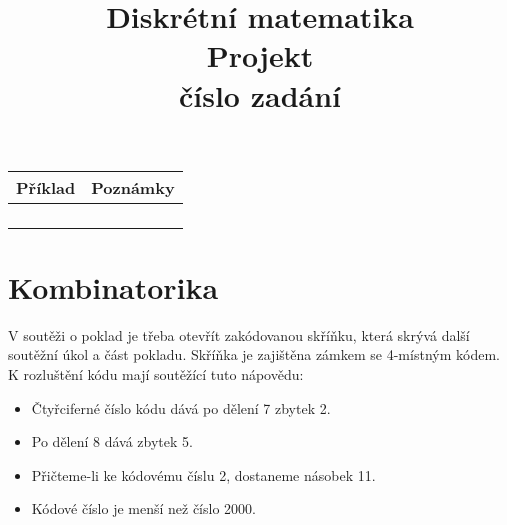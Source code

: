 \documentclass[a4paper, 10pt, oneside]{article}       %
\title{\Huge\textbf{Diskrétní matematika}\\
{\textbf{Projekt}}\\
{\Large číslo zadání \underline{\makebox[1cm]{3}}}}
\author{}                                             %
\date{}
\begin{document}
\shorthandoff{-}

\maketitle\thispagestyle{fancy}

\vfill
\hfill
\begin{table}[b]
  \begin{tabular}{c|p{3cm}}
    \textbf{Příklad} & \textbf{Poznámky} \\
    \hline
        \rule{0pt}{1cm} \centering 1 &  \\
        \rule{0pt}{1.5cm}\\
        \rule{0pt}{1cm} \centering 2 &  \\
        \rule{0pt}{1.5cm}\\
  \end{tabular}
\end{table}

\clearpage                                            %

\fancyhead{}                                          %
\fancyfoot{}                                          %


\fancyhead[RO]{\thepage}                              %

\newpage
\setcounter{page}{1}
\section{Kombinatorika}\label{sec:sec_1}

V soutěži o poklad je třeba otevřít zakódovanou skříňku, která skrývá další soutěžní úkol a část pokladu. Skříňka je zajištěna zámkem se 4-místným kódem. K rozluštění kódu mají soutěžící tuto nápovědu:
\begin{itemize}
    \item Čtyřciferné číslo kódu dává po dělení 7 zbytek 2.
    \item Po dělení 8 dává zbytek 5.
    \item Přičteme-li ke kódovému číslu 2, dostaneme násobek 11.
    \item Kódové číslo je menší než číslo 2000.
\end{itemize}
\end{document}
